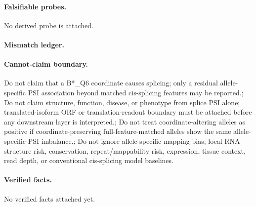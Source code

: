 \paragraph{Falsifiable probes.}
No derived probe is attached.

\paragraph{Mismatch ledger.}
\paragraph{Cannot-claim boundary.} Do not claim that a B*\_Q6 coordinate causes splicing; only a residual allele-specific PSI association beyond matched cis-splicing features may be reported.; Do not claim structure, function, disease, or phenotype from splice PSI alone; translated-isoform ORF or translation-readout boundary must be attached before any downstream layer is interpreted.; Do not treat coordinate-altering alleles as positive if coordinate-preserving full-feature-matched alleles show the same allele-specific PSI imbalance.; Do not ignore allele-specific mapping bias, local RNA-structure risk, conservation, repeat/mappability risk, expression, tissue context, read depth, or conventional cis-splicing model baselines.

\paragraph{Verified facts.}
No verified facts attached yet.
